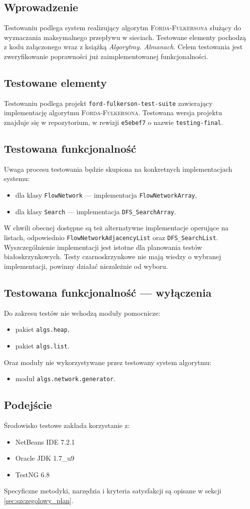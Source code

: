 \subsection{Wprowadzenie}
Testowaniu podlega system realizujący algorytm \textsc{Forda-Fulkersona} służący
do wyznaczania maksymalnego przepływu w sieciach. Testowane elementy pochodzą z
kodu załączonego wraz z książką \emph{Algorytmy. Almanach}. Celem testowania
jest zweryfikowanie poprawności już zaimplementowanej funkcjonalności.

\subsection{Testowane elementy}
Testowaniu podlega projekt \texttt{ford-fulkerson-test-suite} zawierający
implementację algorytmu \textsc{Forda-Fulkersona}. Testowana wersja projektu
znajduje się w repozytorium, w rewizji \texttt{e5ebef7} o nazwie \texttt
{testing-final}.

\subsection{Testowana funkcjonalność}
Uwaga procesu testowania będzie skupiona na konkretnych implementacjach systemu:
\begin{itemize}
    \item dla klasy \texttt{FlowNetwork} --- implementacja
        \texttt{FlowNetworkArray},
    \item dla klasy \texttt{Search} --- implementacja \texttt{DFS\_SearchArray}.
\end{itemize}
W chwili obecnej dostępne są też alternatywne implementacje operujące na
listach, odpowiednio \texttt{FlowNetworkAdjacencyList} oraz
\texttt{DFS\_SearchList}. Wyszczególnienie implementacji jest istotne dla
planowania testów biało\dywiz skrzynkowych. Testy czarno\dywiz skrzynkowe
nie mają wiedzy o wybranej implementacji, powinny działać niezależnie od wyboru.

\subsection{Testowana funkcjonalność --- wyłączenia}
Do zakresu testów nie wchodzą moduły pomocnicze:
\begin{itemize}
    \item pakiet \texttt{algs.heap},
    \item pakiet \texttt{algs.list}.
\end{itemize}
Oraz moduły nie wykorzystywane przez testowany system algorytmu:
\begin{itemize}
    \item moduł \texttt{algs.network.generator}.
\end{itemize}

\subsection{Podejście}
Środowisko testowe zakłada korzystanie z:
\begin{itemize}
    \item NetBeans IDE 7.2.1
    \item Oracle JDK 1.7\_u9
    \item TestNG 6.8
\end{itemize}

\noindent
Specyficzne metodyki, narzędzia i kryteria satysfakcji są opisane w sekcji
\ref{sec:szczegolowy_plan}.
